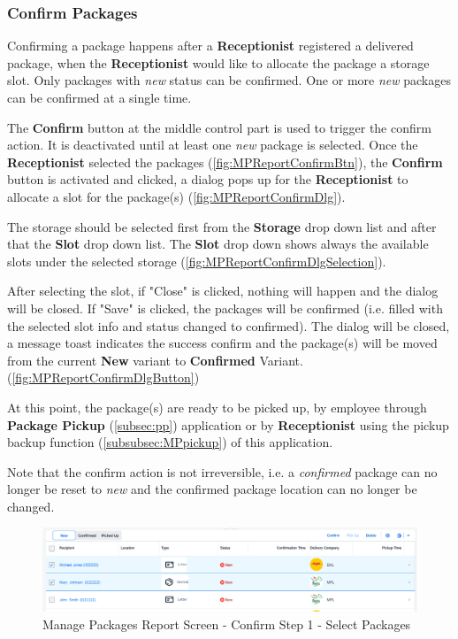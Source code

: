 \subsubsection{Confirm Packages}

Confirming a package happens after a \textbf{Receptionist} registered a delivered package, when the \textbf{Receptionist} would like to allocate the package a storage slot. Only packages with \textit{new} status can be confirmed. One or more \textit{new} packages can be confirmed at a single time.

The \textbf{Confirm} button at the middle control part is used to trigger the confirm action. It is deactivated until at least one \textit{new} package is selected.
Once the \textbf{Receptionist} selected the packages (\autoref{fig:MPReportConfirmBtn}), the \textbf{Confirm} button is activated and clicked, a dialog pops up for the \textbf{Receptionist} to allocate a slot for the package(s) (\autoref{fig:MPReportConfirmDlg}). 

The storage should be selected first from the \textbf{Storage} drop down list and after that the \textbf{Slot} drop down list. The \textbf{Slot} drop down shows always the available slots under the selected storage (\autoref{fig:MPReportConfirmDlgSelection}).

After selecting the slot, if "Close" is clicked, nothing will happen and the dialog will be closed. If "Save" is clicked, the packages will be confirmed (i.e. filled with the selected slot info and status changed to confirmed). The dialog will be closed, a message toast indicates the success confirm and the package(s) will be moved from the current \textbf{New} variant to \textbf{Confirmed} Variant. (\autoref{fig:MPReportConfirmDlgButton})

At this point, the package(s) are ready to be picked up, by employee through \textbf{Package Pickup} (\autoref{subsec:pp}) application or by \textbf{Receptionist} using the pickup backup function (\autoref{subsubsec:MPpickup}) of this application.

\bigskip
Note that the confirm action is not irreversible, i.e. a \textit{confirmed} package can no longer be reset to \textit{new} and the confirmed package location can no longer be changed.

\bigskip
\begin{figure}[H]
	\centering
	\includegraphics[width=1\linewidth]{images/user_doc/managePack/ReportScreen/browse/confirmActivated.png}
	\caption{Manage Packages Report Screen - Confirm Step 1 - Select Packages}
	\label{fig:MPReportConfirmBtn}
\end{figure}

